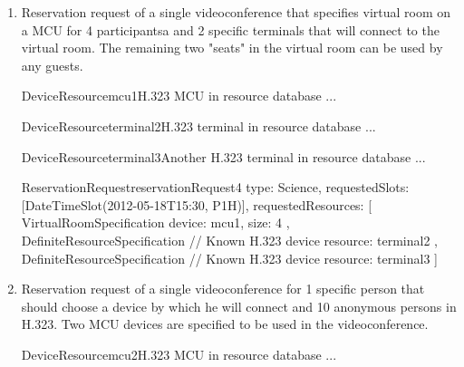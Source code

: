 \begin{enumerate}
\begin{EntityExample}{ReservationRequest}{reservationRequest3}{}
type: Science,
requestedSlots: [DateTimeSlot(2012-05-18T15:30, P1H)],
requestedPersons: [
  PersonByIdentity(srom@cesnet.cz),  // Martin Srom (must choose a device)
  PersonByIdentity(hopet@cesnet.cz), // Petr Holub (must choose a device)
  Person { // Jan Ruzicka (must choose a device)
    name: Jan Ruzicka,
    email: janru@cesnet.cz
  }
]
\end{EntityExample}

\item Reservation request of a single videoconference that specifies virtual room on a MCU for 4 participantsa and 2 specific terminals that will connect to the virtual room. The remaining two "seats" in the virtual room can be used by any guests.

\begin{EntityExample}{DeviceResource}{mcu1}{H.323 MCU in resource database}
...
\end{EntityExample}

\begin{EntityExample}{DeviceResource}{terminal2}{H.323 terminal in resource database}
...
\end{EntityExample}

\begin{EntityExample}{DeviceResource}{terminal3}{Another H.323 terminal in resource database}
...
\end{EntityExample}

\begin{EntityExample}{ReservationRequest}{reservationRequest4}{}
type: Science,
requestedSlots: [DateTimeSlot(2012-05-18T15:30, P1H)],
requestedResources: [
  VirtualRoomSpecification {
    device: mcu1,
    size: 4
  },
  DefiniteResourceSpecification { // Known H.323 device
    resource: terminal2
  },
  DefiniteResourceSpecification { // Known H.323 device
    resource: terminal3
  }
]
\end{EntityExample}

\item Reservation request of a single videoconference for 1 specific person that should choose a device by which he will connect and 10 anonymous persons in H.323. Two MCU devices are specified to be used in the videoconference.


\begin{EntityExample}{DeviceResource}{mcu2}{H.323 MCU in resource database}
...
\end{EntityExample}


\end{enumerate}
